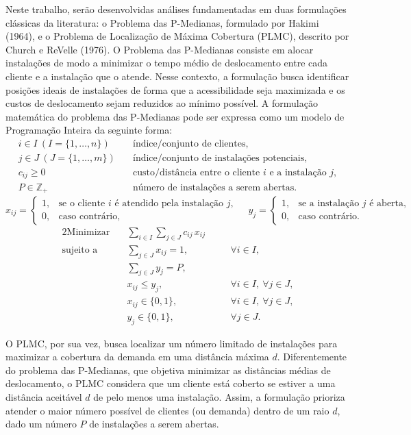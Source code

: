 \documentclass[12pt]{article}
\begin{document}
Neste trabalho, serão desenvolvidas análises fundamentadas em duas formulações clássicas da literatura: o Problema das P-Medianas, formulado por Hakimi (1964), e o Problema de Localização de Máxima Cobertura (PLMC), descrito por Church e ReVelle (1976). O Problema das P-Medianas consiste em alocar instalações de modo a minimizar o tempo médio de deslocamento entre cada cliente e a instalação que o atende. Nesse contexto, a formulação busca identificar posições ideais de instalações de forma que a acessibilidade seja maximizada e os custos de deslocamento sejam reduzidos ao mínimo possível. A formulação matemática do problema das P-Medianas pode ser expressa como um modelo de Programação Inteira da seguinte forma:
\[
\begin{aligned}
i \in I\ (I=\{1,\ldots,n\}) &\quad \text{índice/conjunto de clientes},\\
j \in J\ (J=\{1,\ldots,m\}) &\quad \text{índice/conjunto de instalações potenciais},\\
c_{ij} \ge 0 &\quad \text{custo/distância entre o cliente $i$ e a instalação $j$},\\
P \in \mathbb{Z}_{+} &\quad \text{número de instalações a serem abertas}.
\end{aligned}
\]
\[
x_{ij} =
\begin{cases}
1, & \text{se o cliente $i$ é atendido pela instalação $j$},\\
0, & \text{caso contrário},
\end{cases}
\quad
y_{j} =
\begin{cases}
1, & \text{se a instalação $j$ é aberta},\\
0, & \text{caso contrário}.
\end{cases}
\]
\begin{alignat*}{2}
\text{Minimizar}\quad 
& \sum_{i \in I}\sum_{j \in J} c_{ij}\,x_{ij} \\
\text{sujeito a}\quad
& \sum_{j \in J} x_{ij} = 1,                 && \quad \forall i \in I, \\
& \sum_{j \in J} y_{j} = P,                  && \\
& x_{ij} \le y_{j},                          && \quad \forall i \in I,\ \forall j \in J, \\
& x_{ij} \in \{0,1\},                        && \quad \forall i \in I,\ \forall j \in J, \\
& y_{j} \in \{0,1\},                         && \quad \forall j \in J.
\end{alignat*}

O PLMC, por sua vez, busca localizar um número limitado de instalações para maximizar a cobertura da demanda em uma distância máxima \(d\). Diferentemente do problema das P-Medianas, que objetiva minimizar as distâncias médias de deslocamento, o PLMC considera que um cliente está coberto se estiver a uma distância aceitável \(d\) de pelo menos uma instalação. Assim, a formulação prioriza atender o maior número possível de clientes (ou demanda) dentro de um raio \(d\), dado um número \(P\) de instalações a serem abertas.
\end{document}
